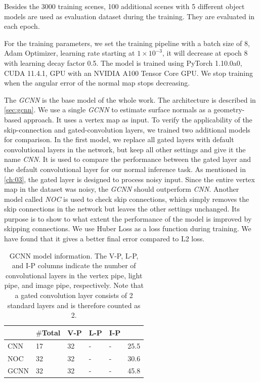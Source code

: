Besides the 3000 training scenes, 100 additional scenes with 5 different object models are used as evaluation dataset during the training. They are evaluated in each epoch. 

For the training parameters, we set the training pipeline with a batch size of 8, Adam Optimizer\cite{adam}, learning rate starting at $ 1\times10^{-3} $, it will decrease at epoch 8 with learning decay factor 0.5. The model is trained using PyTorch 1.10.0a0, CUDA 11.4.1, GPU with an NVIDIA A100 Tensor Core GPU. We stop training when the angular error of the normal map stops decreasing.

The \textit{GCNN} is the base model of the whole work. The architecture is described in \ref{sec:gcnn}. We use a single \textit{GCNN} to estimate surface normals as a geometry-based approach. It uses a vertex map as input. To verify the applicability of the skip-connection and gated-convolution layers, we trained two additional models for comparison. 
In the first model, we replace all gated layers with default convolutional layers in the network, but keep all other settings and give it the name \textit{CNN}. It is used to compare the performance between the gated layer and the default convolutional layer for our normal inference task. As mentioned in \ref{ch:03}, the gated layer is designed to process noisy input. Since the entire vertex map in the dataset was noisy, the \textit{GCNN} should outperform \textit{CNN}. 
Another model called \textit{NOC} is used to check skip connections, which simply removes the skip connections in the network but leaves the other settings unchanged. Its purpose is to show to what extent the performance of the model is improved by skipping connections. We use Huber Loss as a loss function during training. We have found that it gives a better final error compared to L2 loss. 



\begin{table}[H]
	\centering
	\captionsetup{width=\linewidth}
	\begin{tabular}{l | l l l l l }
		\toprule
		\tabhead{Model} & $ \# $\textbf{Total} &\textbf{ V-P} & \textbf{L-P} & \textbf{I-P} & \tabhead{Size /MB}\\
		\midrule
		\hline
		CNN 					& 17 & 32 & - & - & 25.5 \\
		\hline
		NOC 					& 32 & 32 & - & - & 30.6 \\
		\hline
		GCNN 					& 32 & 32 & - & - & 45.8 \\
		\bottomrule
	\end{tabular}
	\caption{GCNN model information. The V-P, L-P, and I-P columns indicate the number of convolutional layers in the vertex pipe, light pipe, and image pipe, respectively. Note that a gated convolution layer consists of 2 standard layers and is therefore counted as 2.}	
	\label{tab:gcnn-eval-mean}
\end{table}


